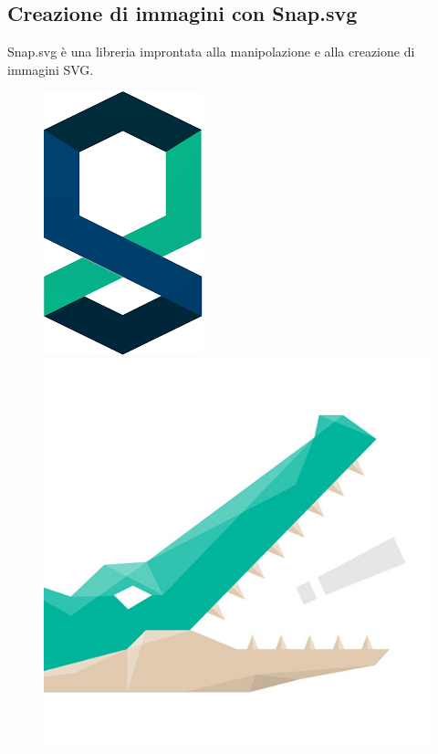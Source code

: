 \subsection{Creazione di immagini con Snap.svg}
\noindent Snap.svg \cite{snapSite} è una libreria improntata alla manipolazione e alla creazione di immagini SVG.\newline
\begin{figure}[H]
\centering
\begin{minipage}{.5\textwidth}
  \centering
  \includegraphics[width=.54\linewidth]{img/snap.png}
\end{minipage}%
\begin{minipage}{.5\textwidth}
  \centering
  \includegraphics[width=.9\linewidth]{img/snap2.jpg}
\end{minipage}
\end{figure}
